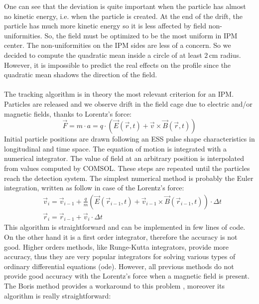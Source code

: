 \begin{refsection}
	

	One can see that the deviation is quite important when the particle has almost no kinetic energy, i.e. when the particle is created.
	At the end of the drift, the particle has much more kinetic energy so it is less affected by field non-uniformities. So, the field must be optimized to be the most uniform in IPM center. The non-uniformities on the IPM sides are less of a concern.
	So we decided to compute the quadratic mean inside a circle of at least $2\,\mathrm{cm}$ radius. However, it is impossible to predict the real effects on the profile since the quadratic mean shadows the direction of the field.

	\paragraph{}
	The tracking algorithm is in theory the most relevant criterion for an IPM. Particles are released and we observe drift in the field cage due to electric and/or magnetic fields, thanks to Lorentz’s force:
	\begin{equation}
		\vec{F} = m \cdot a = q \cdot (\vec{E}(\vec{r},t) + \vec{v} \times \vec{B}(\vec{r},t))
	\end{equation}
	Initial particle positions are drawn following an ESS pulse shape characteristics in longitudinal and time space. The equation of motion is integrated with a numerical integrator. The value of field at an arbitrary position is interpolated from values computed by COMSOL. These steps are repeated until the particles reach the detection system. The simplest numerical method is probably the Euler integration, written as follow in case of the Lorentz’s force:
	\begin{align}
		 & \vec{v}_{i} = \vec{v}_{i-1} + \frac{q}{m}(\vec{E}(\vec{r}_{i-1},t) + \vec{v}_{i-1} \times \vec{B}(\vec{r}_{i-1},t)) \cdot \Delta t \\
		 & \vec{r}_{i} = \vec{r}_{i-1} + \vec{v}_{i} \cdot \Delta t
	\end{align}
	This algorithm is straightforward and can be implemented in few lines of code. On the other hand it is a first order integrator, therefore the accuracy is not good. Higher orders methods, like Runge-Kutta integrators, provide more accuracy, thus they are very popular integrators for solving various types of ordinary differential equations (\acrshort{ode}). However, all previous methods do not provide good accuracy with the Lorentz’s force when a magnetic field is present. The Boris method provides a workaround to this problem \cite{Boris1970}, moreover its algorithm is really straightforward:

\end{refsection}
